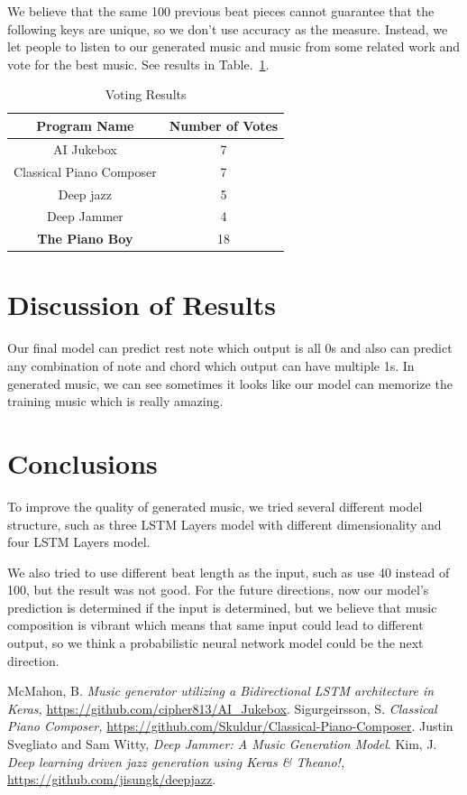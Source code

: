 \documentclass[conference]{IEEEtran}
\begin{document}
We believe that the same 100 previous beat pieces cannot guarantee that the following keys are unique, so we don't use accuracy as the measure. Instead, we let people to listen to our generated music and music from some related work and vote for the best music. See results in Table.~\ref{tab1}.

\begin{table}[htbp]
\caption{Voting Results}
\begin{center}
\begin{tabular}{|c|c|}
\hline
Program Name& Number of Votes\\
\hline
AI Jukebox& 7\\
Classical Piano Composer& 7\\
Deep jazz& 5\\
Deep Jammer& 4\\
\textbf{The Piano Boy}& 18\\
\hline
\end{tabular}
\label{tab1}
\end{center}
\end{table}

\section{Discussion of Results}
Our final model can predict rest note which output is all 0s and also can predict any combination of note and chord which output can have multiple 1s. In generated music, we can see sometimes it looks like our model can memorize the training music which is really amazing.

\section{Conclusions}
To improve the quality of generated music, we tried several different model structure, such as three LSTM Layers model with different dimensionality and four LSTM Layers model.

We also tried to use different beat length as the input, such as use 40 instead of 100, but the result was not good.						
For the future directions, now our model's prediction is determined if the input is determined, but we believe that music composition is vibrant which means that same input could lead to different output, so we think a probabilistic neural network model could be the next direction.

\begin{thebibliography}{00}
 McMahon, B. \textit{Music generator utilizing a Bidirectional LSTM architecture in Keras,} \url{https://github.com/cipher813/AI_Jukebox}.
 Sigurgeirsson, S. \textit{Classical Piano Composer,} \url{https://github.com/Skuldur/Classical-Piano-Composer}.
 Justin Svegliato and Sam Witty, \textit{Deep Jammer: A Music Generation Model}.
 Kim, J. \textit{Deep learning driven jazz generation using Keras \& Theano!,} \url{https://github.com/jisungk/deepjazz}.
\end{thebibliography}
\vspace{12pt}
\end{document}
